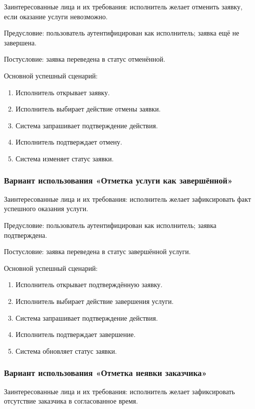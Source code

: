 Заинтересованные лица и их требования: исполнитель желает отменить заявку, если оказание услуги невозможно.

Предусловие: пользователь аутентифицирован как исполнитель; заявка ещё не завершена.

Постусловие: заявка переведена в статус отменённой.

Основной успешный сценарий:
\begin{enumerate}
	\item Исполнитель открывает заявку.
	\item Исполнитель выбирает действие отмены заявки.
	\item Система запрашивает подтверждение действия.
	\item Исполнитель подтверждает отмену.
	\item Система изменяет статус заявки.
\end{enumerate}

\subsubsection{Вариант использования «Отметка услуги как завершённой»}

Заинтересованные лица и их требования: исполнитель желает зафиксировать факт успешного оказания услуги.

Предусловие: пользователь аутентифицирован как исполнитель; заявка подтверждена.

Постусловие: заявка переведена в статус завершённой услуги.

Основной успешный сценарий:
\begin{enumerate}
	\item Исполнитель открывает подтверждённую заявку.
	\item Исполнитель выбирает действие завершения услуги.
	\item Система запрашивает подтверждение действия.
	\item Исполнитель подтверждает завершение.
	\item Система обновляет статус заявки.
\end{enumerate}

\subsubsection{Вариант использования «Отметка неявки заказчика»}

Заинтересованные лица и их требования: исполнитель желает зафиксировать отсутствие заказчика в согласованное время.

